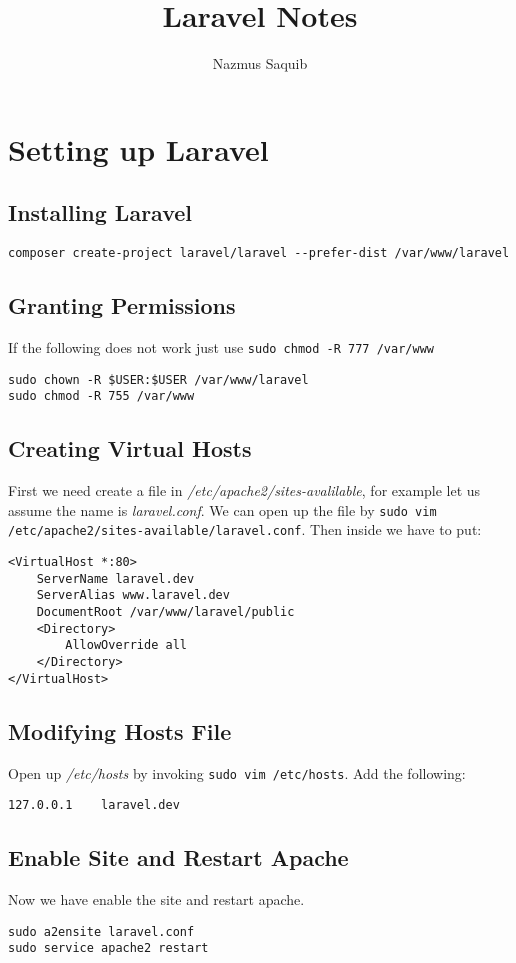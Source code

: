 \documentclass[a4paper, 12pt]{article}
\begin{document}
\title{Laravel Notes}
\author{Nazmus Saquib}

\maketitle
\tableofcontents

\section{Setting up Laravel}
\subsection{Installing Laravel}
\begin{verbatim}
composer create-project laravel/laravel --prefer-dist /var/www/laravel
\end{verbatim}
\subsection{Granting Permissions}
If the following does not work just use \verb|sudo chmod -R 777 /var/www|
\begin{verbatim}
sudo chown -R $USER:$USER /var/www/laravel
sudo chmod -R 755 /var/www
\end{verbatim}
\subsection{Creating Virtual Hosts}
First we need create a file in \emph{/etc/apache2/sites-avalilable}, for example let us assume the name is \emph{laravel.conf}.
We can open up the file by \verb|sudo vim /etc/apache2/sites-available/laravel.conf|. Then inside we have to put:
\begin{verbatim}
<VirtualHost *:80>
	ServerName laravel.dev
	ServerAlias www.laravel.dev
	DocumentRoot /var/www/laravel/public
	<Directory>
		AllowOverride all
	</Directory>
</VirtualHost>
\end{verbatim}
\subsection{Modifying Hosts File}
Open up \emph{/etc/hosts} by invoking \verb|sudo vim /etc/hosts|.
Add the following:
\begin{verbatim}
127.0.0.1    laravel.dev
\end{verbatim}
\subsection{Enable Site and Restart Apache}
Now we have enable the site and restart apache.
\begin{verbatim}
sudo a2ensite laravel.conf
sudo service apache2 restart
\end{verbatim}
\end{document}
